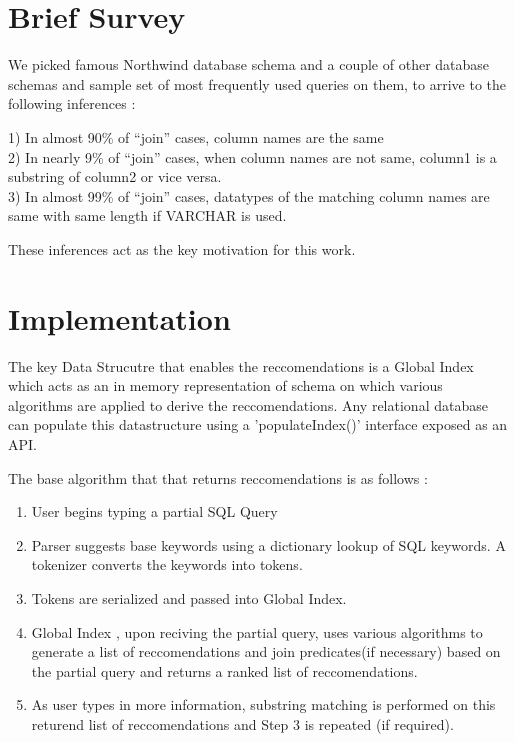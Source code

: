 \documentclass{acm_proc_article-sp}
\begin{document}
\section{Brief Survey}
We picked famous Northwind database schema and a couple of other database schemas and sample set of most frequently used queries on them, to arrive to the following inferences : 

1) In almost 90\% of ``join'' cases, column names are the same
\\2) In nearly 9\% of ``join'' cases, when column names are not same, column1 is a substring of column2 or vice versa.
\\3) In almost 99\% of ``join'' cases, datatypes of the matching column names are same with same length if VARCHAR is used. 

These inferences act as the key motivation for this work. 

\section{Implementation}
The key Data Strucutre that enables the reccomendations is a Global Index which acts as an in memory representation of schema on which various algorithms are applied to derive the reccomendations. Any relational database can populate this datastructure using a 'populateIndex()' interface exposed as an API.  

The base algorithm that that returns reccomendations is as follows : 

\begin {enumerate}
\item   User begins typing a partial SQL Query
\item  Parser suggests base keywords using a dictionary lookup of SQL keywords. A tokenizer converts the keywords into tokens. 
\item Tokens are serialized and passed into Global Index. 
\item Global Index , upon reciving the partial query, uses various algorithms to generate a list of reccomendations and join predicates(if necessary) based on the partial query and returns a ranked list of reccomendations. 
\item As user types in more information, substring matching is performed on this returend list of reccomendations and Step 3 is repeated (if required). 
\end {enumerate}
\end{document}
